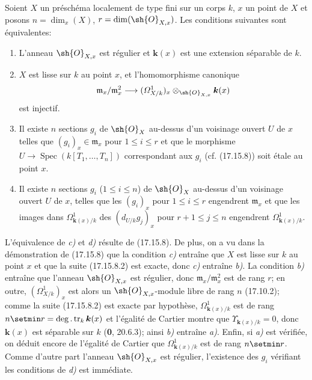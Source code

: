 \begin{corollary}[17.15.9]
\label{IV.17.15.9}
Soient $X$ un préschéma localement de type fini sur un corps $k$, $x$ un point de $X$ et posons $n=\dim_x(X)$, $r=\dim(\sh{O}_{X,x})$. Les conditions suivantes sont équivalentes:
\begin{enumerate}
  \item[\textup{a)}] L'anneau $\sh{O}_{X,x}$ est régulier et $\boldsymbol{k}(x)$ est une extension séparable de $k$.
  \item[\textup{b)}] $X$ est lisse sur $k$ au point $x$, et l'homomorphisme canonique
  \[
  \mathfrak m_x/\mathfrak m_x^2\to(\varOmega^1_{X/k})_x\otimes_{\sh{O}_{X,x}}\boldsymbol{k}(x)
  \]
  est injectif.
  \item[\textup{c)}] Il existe $n$ sections $g_i$ de $\sh{O}_X$ au-dessus d'un voisinage ouvert $U$ de $x$ telles que $(g_i)_x\in\mathfrak m_x$ pour $1\leq i\leq r$ et que le morphisme $U\to\operatorname{Spec}(k[T_1,\ldots,T_n])$ correspondant aux $g_i$ \textup{(cf. (17.15.8))} soit étale au point $x$.
  \item[\textup{d)}] Il existe $n$ sections $g_i$ \textup{(}$1\leq i\leq n$\textup{)} de $\sh{O}_X$ au-dessus d'un voisinage ouvert $U$ de $x$, telles que les $(g_i)_x$ pour $1\leq i\leq r$ engendrent $\mathfrak m_x$ et que les images dans $\Omega^1_{\mathbf{k}(x)/k}$ des $(d_{U/k}g_j)_x$ pour $r+1\leq j\leq n$ engendrent $\Omega^1_{\mathbf{k}(x)/k}$.
\end{enumerate}
\end{corollary}

L'équivalence de \emph{c)} et \emph{d)} résulte de (17.15.8). De plus, on a vu dans la démonstration de (17.15.8) que la condition \emph{c)} entraîne que $X$ est lisse sur $k$ au point $x$ et que la suite (17.15.8.2) est exacte, donc \emph{c)} entraîne \emph{b)}. La condition \emph{b)} entraîne que l'anneau $\sh{O}_{X,x}$ est régulier, donc $\mathfrak m_x/\mathfrak m_x^2$ est de rang $r$; en outre, $(\varOmega^1_{X/k})_x$ est alors un $\sh{O}_{X,x}$-module libre de rang $n$ (17.10.2); comme la suite (17.15.8.2) est exacte par hypothèse, $\Omega^1_{\mathbf{k}(x)/k}$ est de rang $n\setmin r=\deg.\operatorname{tr}_k \boldsymbol{k}(x)$ et l'égalité de Cartier montre que $\Upsilon_{\mathbf{k}(x)/k}=0$, donc $\boldsymbol{k}(x)$ est séparable sur $k$ (\textbf{0}, 20.6.3); ainsi \emph{b)} entraîne \emph{a)}. Enfin, si \emph{a)}
est vérifiée, on déduit encore de l'égalité de Cartier que $\Omega^1_{\mathbf{k}(x)/k}$ est de rang $n\setmin r$. Comme d'autre part l'anneau $\sh{O}_{X,x}$ est régulier, l'existence des $g_i$ vérifiant les conditions de \emph{d)} est immédiate.


